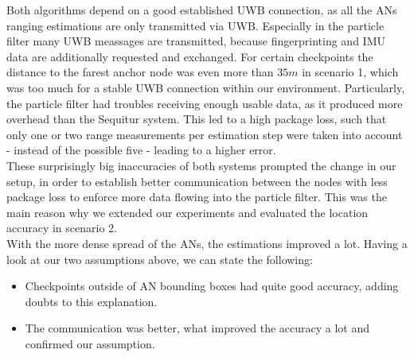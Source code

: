 \noindent\hspace*{5mm}%
Both algorithms depend on a good established UWB connection, as all the ANs ranging estimations are only transmitted via UWB. Especially in the particle filter many UWB meassages are transmitted, because fingerprinting and IMU data are additionally requested and exchanged. For certain checkpoints the distance to the farest anchor node was even more than $35m$ in scenario 1, which was too much for a stable UWB connection within our environment. Particularly, the particle filter had troubles receiving enough usable data, as it produced more overhead than the Sequitur system. This led to a high package loss, such that only one or two range measurements per estimation step were taken into account - instead of the possible five - leading to a higher error. \\
\noindent\hspace*{5mm}%
These surprisingly big inaccuracies of both systems prompted the change in our setup, in order to establish better communication between the nodes with less package loss to enforce more data flowing into the particle filter. This was the main reason why we extended our experiments and evaluated the location accuracy in scenario 2.\\
\noindent\hspace*{5mm}%
With the more dense spread of the ANs, the estimations improved a lot. Having a look at our two assumptions above, we can state the following:

\begin{itemize}
\item Checkpoints outside of AN bounding boxes had quite good accuracy, adding doubts to this explanation.
\item The communication was better, what improved the accuracy a lot and confirmed our assumption.
\end{itemize}

